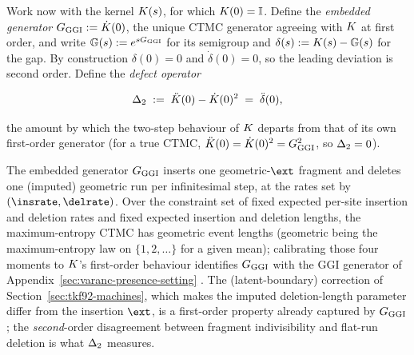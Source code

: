 Work now with the kernel $K(s)$, for which $K(0)=\mathbb{I}$.
Define the \emph{embedded generator} $G_{\mathrm{GGI}} := \dot{K}(0)$, the
unique CTMC generator agreeing with $K$ at first order, and write
$\mathbb{G}(s) := e^{sG_{\mathrm{GGI}}}$ for its semigroup and
$\delta(s) := K(s) - \mathbb{G}(s)$ for the gap.  By construction
$\delta(0)=0$ and $\dot\delta(0)=0$, so the leading deviation is second
order.  Define the \emph{defect operator}

\begin{equation}
\label{eq:defect-def}
\Delta_2 \;:=\; \ddot{K}(0) - \dot{K}(0)^2
\;=\; \ddot\delta(0),
\end{equation}

the amount by which the two-step behaviour of $K$ departs from
that of its own first-order generator (for a true CTMC,
$\ddot{K}(0) = \dot{K}(0)^2 = G_{\mathrm{GGI}}^2$, so
$\Delta_2=0$).

\begin{remark}
\label{rem:embedded-is-ggi}
The embedded generator $G_{\mathrm{GGI}}$ inserts one geometric-$\ext$ fragment and
deletes one (imputed) geometric run per infinitesimal step, at the rates
set by $(\insrate,\delrate)$.  Over the constraint set of fixed expected
per-site insertion and deletion rates and fixed expected insertion and
deletion lengths, the maximum-entropy CTMC has geometric event lengths
(geometric being the maximum-entropy law on $\{1,2,\dots\}$ for a given
mean); calibrating those four moments to $K$'s first-order
behaviour identifies $G_{\mathrm{GGI}}$ with the GGI generator of
Appendix~\ref{sec:varanc-presence-setting} \cite{Holmes2020}.  The
(latent-boundary) correction of Section~\ref{sec:tkf92-machines}, which
makes the imputed deletion-length parameter differ from the insertion
$\ext$, is a first-order property already captured by $G_{\mathrm{GGI}}$; the
\emph{second}-order disagreement between fragment indivisibility and
flat-run deletion is what $\Delta_2$ measures.
\end{remark}

